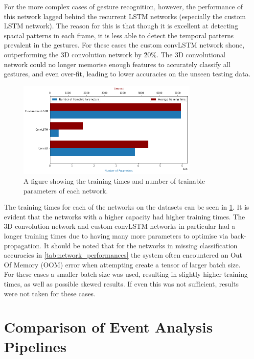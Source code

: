 For the more complex cases of gesture recognition, however, the performance of this network lagged behind the recurrent LSTM networks (especially the custom LSTM network). The reason for this is that though it is excellent at detecting spacial patterns in each frame, it is less able to detect the temporal patterns prevalent in the gestures. For these cases the custom convLSTM network shone, outperforming the 3D convolution network by \~20\%. The 3D convolutional network could no longer memorise enough features to accurately classify all gestures, and even over-fit, leading to lower accuracies on the unseen testing data.

\begin{figure}[htb]
    \centering
    \includegraphics[width=0.8\textwidth]{testingandresults/images/training_time_and_trainable_parameters.png}
    \caption{A figure showing the training times and number of trainable parameters of each network.}
    \label{fig:training_times_and_trainable_parameters}
\end{figure}

The training times for each of the networks on the datasets can be seen in \cref{fig:training_times_and_trainable_parameters}. It is evident that the networks with a higher capacity had higher training times. The 3D convolution network and custom convLSTM networks in particular had a longer training times due to having many more parameters to optimise via back-propagation. It should be noted that for the networks in missing classification accuracies in \cref{tab:network_performances} the system often encountered an Out Of Memory (OOM) error when attempting create a tensor of larger batch size. For these cases a smaller batch size was used, resulting in slightly higher training times, as well as possible skewed results. If even this was not sufficient, results were not taken for these cases.

\section{Comparison of Event Analysis Pipelines}

